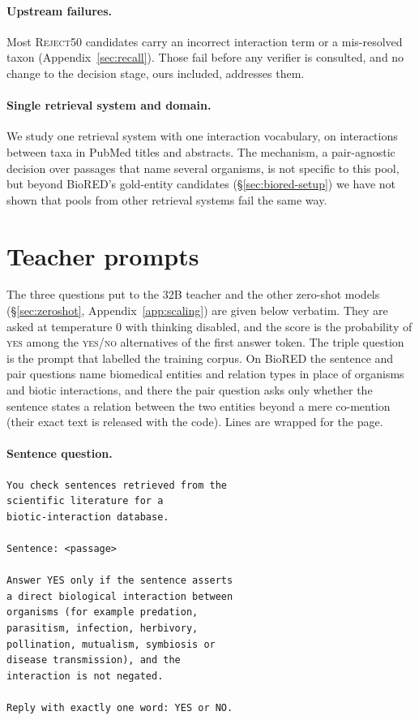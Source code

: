 \documentclass[11pt]{article}
\begin{document}
\paragraph{Upstream failures.}
Most \textsc{Reject50} candidates carry an incorrect interaction term or a mis-resolved taxon
(Appendix~\ref{sec:recall}). Those fail before any verifier is consulted, and no change to
the decision stage, ours included, addresses them.

\paragraph{Single retrieval system and domain.}
We study one retrieval system with one interaction vocabulary, on interactions between taxa in PubMed titles and abstracts\@. The
mechanism, a pair-agnostic decision over passages that name several organisms, is not specific to
this pool, but beyond BioRED's gold-entity candidates (\S\ref{sec:biored-setup}) we have not shown
that pools from other retrieval systems fail the same way.



\appendix

\section{Teacher prompts}
\label{app:prompts}

The three questions put to the 32B teacher and the other zero-shot models (\S\ref{sec:zeroshot},
Appendix~\ref{app:scaling}) are given below verbatim. They are asked at temperature 0 with thinking
disabled, and the score is the probability of \textsc{yes} among the \textsc{yes}/\textsc{no}
alternatives of the first answer token. The triple question is the prompt that labelled the training corpus. On BioRED the sentence
and pair questions name biomedical entities and relation types in place of organisms and biotic
interactions, and there the pair question asks only whether the sentence states a relation between the two entities beyond a mere co-mention (their exact text is released with the code). Lines are wrapped for the page.

\paragraph{Sentence question.}
\begin{footnotesize}
\begin{verbatim}
You check sentences retrieved from the
scientific literature for a
biotic-interaction database.

Sentence: <passage>

Answer YES only if the sentence asserts
a direct biological interaction between
organisms (for example predation,
parasitism, infection, herbivory,
pollination, mutualism, symbiosis or
disease transmission), and the
interaction is not negated.

Reply with exactly one word: YES or NO.
\end{verbatim}
\end{footnotesize}
\end{document}

